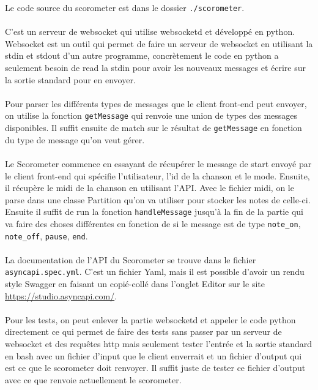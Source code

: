 Le code source du scorometer est dans le dossier \texttt{./scorometer}.
\\\\
C’est un serveur de websocket qui utilise websocketd et développé en python.
Websocket est un outil qui permet de faire un serveur de websocket en utilisant la stdin et stdout d’un autre programme, concrètement le code en python a seulement besoin de read la stdin pour avoir les nouveaux messages et écrire sur la sortie standard pour en envoyer.
\\\\
Pour parser les différents types de messages que le client front-end peut envoyer, on utilise la fonction \texttt{getMessage} qui renvoie une union de types des messages disponibles. Il suffit ensuite de match sur le résultat de \texttt{getMessage} en fonction du type de message qu’on veut gérer.
\\\\
Le Scorometer commence en essayant de récupérer le message de start envoyé par le client front-end qui spécifie l’utilisateur, l’id de la chanson et le mode. Ensuite, il récupère le midi de la chanson en utilisant l’API. Avec le fichier midi, on le parse dans une classe Partition qu’on va utiliser pour stocker les notes de celle-ci. Ensuite il suffit de run la fonction \texttt{handleMessage} jusqu'à la fin de la partie qui va faire des choses différentes en fonction de si le message est de type \verb|note_on|, \verb|note_off|, \verb|pause|, \verb|end|.
\\\\
La documentation de l’API du Scorometer se trouve dans le fichier \verb|asyncapi.spec.yml|. C’est un fichier Yaml, mais il est possible d’avoir un rendu style Swagger en faisant un copié-collé dans l'onglet Editor sur le site \url{https://studio.asyncapi.com/}.
\\\\
Pour les tests, on peut enlever la partie websocketd et appeler le code python directement ce qui permet de faire des tests sans passer par un serveur de websocket et des requêtes http mais seulement tester l'entrée et la sortie standard en bash avec un fichier d’input que le client enverrait et un fichier d’output qui est ce que le scorometer doit renvoyer. Il suffit juste de tester ce fichier d’output avec ce que renvoie actuellement le scorometer.
